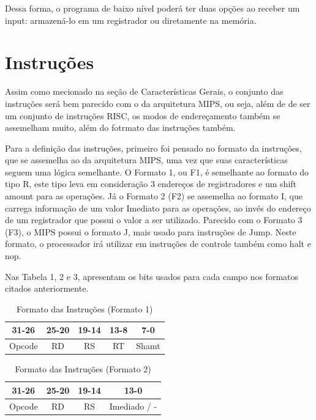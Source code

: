 \documentclass[
	12pt,				%
	openright,			%
	a4paper,			%
	english,			%
	french,				%
	spanish,			%
	brazil,				%
	]{abntex2}
\begin{document}
Dessa forma, o programa de baixo nível poderá ter duas opções ao receber um input: armazená-lo em um registrador ou diretamente na memória.

\section{Instruções}
Assim como mecionado na seção de Características Gerais, o conjunto das instruções será bem parecido com o da arquitetura MIPS, ou seja, além de de ser um conjunto de instruções RISC, os modos de endereçamento também se assemelham muito, além do fotrmato das instruções também.

Para a definição das instruções, primeiro foi pensado no formato da instruções, que se assemelha ao da arquitetura MIPS, uma vez que suas características seguem uma lógica semelhante.
O Formato 1, ou F1, é semelhante ao formato do tipo R, este tipo leva em consideração 3 endereços de registradores e um shift amount para as operações.
Já o Formato 2 (F2) se assemelha ao formato I, que carrega informação de um valor Imediato para as operações, ao invés do endereço de um registrador que possui o valor a ser utilizado.
Parecido com o Formato 3 (F3), o MIPS possui o formato J, mais usado para instruções de Jump. Neste formato, o processador irá utilizar em instruções de controle também como halt e nop.

Nas Tabela 1, 2 e 3, apresentam os bits usados para cada campo nos formatos citados anteriormente. 

\begin{table}
\centering
\caption{Formato das Instruções (Formato 1)}
    \begin{tabular}{|c|c|c|c|c|}
     \hline
        31-26 & 25-20 & 19-14 & 13-8 & 7-0 \\
        \hline \hline
        Opcode & RD & RS & RT & Shamt \\
     \hline
    \end{tabular}
\end{table}

\begin{table}
    \centering
    \caption{Formato das Instruções (Formato 2)}
    \begin{tabular}{|c|c|c|c|}
        \hline
        31-26 & 25-20 & 19-14 & 13-0 \\
        \hline \hline
        Opcode & RD & RS & Imediado / - \\
        \hline
    \end{tabular}
        \label{tab:exemplo}
\end{table}
\end{document}
